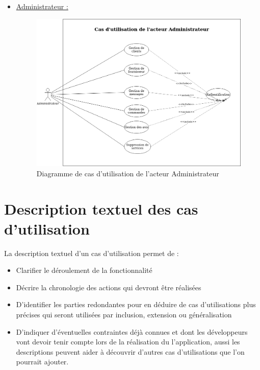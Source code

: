 \documentclass[french]{report}
\begin{document}
\begin{itemize}
\newpage
    \item \underline{Administrateur :}
        \begin{figure}[H]
            \centering
            \includegraphics[width=1\textwidth]{images/Use case Administrateur.drawio.png}
            \caption{Diagramme de cas d'utilisation de l'acteur Administrateur}
            \label{fig:my_label}
        \end{figure}
\end{itemize}

\section{Description textuel des cas d'utilisation}
    La description textuel d’un cas d’utilisation permet de :
    
    \begin{itemize}
        \item Clarifier le déroulement de la fonctionnalité 
        \item Décrire la chronologie des actions qui devront être réalisées 
        \item D’identifier les parties redondantes pour en déduire de cas d’utilisations
plus précises qui seront utilisées par inclusion, extension ou généralisation 
        \item D’indiquer d’éventuelles contraintes déjà connues et dont les développeurs
vont devoir tenir compte lors de la réalisation du l’application, aussi les
descriptions peuvent aider à découvrir d’autres cas d’utilisations que l’on
pourrait ajouter. 
    \end{itemize}
    
\end{document}
